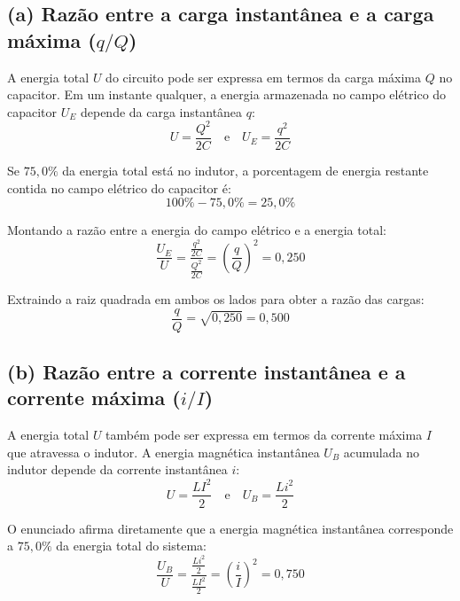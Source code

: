 \documentclass[12pt,a4paper]{article}
\begin{document}
\subsection*{(a) Razão entre a carga instantânea e a carga máxima ($q/Q$)}

A energia total $U$ do circuito pode ser expressa em termos da carga máxima $Q$ no capacitor. Em um instante qualquer, a energia armazenada no campo elétrico do capacitor $U_E$ depende da carga instantânea $q$:
\begin{equation*}
U = \frac{Q^2}{2C} \quad \text{e} \quad U_E = \frac{q^2}{2C}
\end{equation*}

Se $75,0\%$ da energia total está no indutor, a porcentagem de energia restante contida no campo elétrico do capacitor é:
\begin{equation*}
100\% - 75,0\% = 25,0\%
\end{equation*}

Montando a razão entre a energia do campo elétrico e a energia total:
\begin{equation*}
\frac{U_E}{U} = \frac{\frac{q^2}{2C}}{\frac{Q^2}{2C}} = \left(\frac{q}{Q}\right)^2 = 0,250
\end{equation*}

Extraindo a raiz quadrada em ambos os lados para obter a razão das cargas:
\begin{equation*}
\frac{q}{Q} = \sqrt{0,250} = 0,500
\end{equation*}

\subsection*{(b) Razão entre a corrente instantânea e a corrente máxima ($i/I$)}

A energia total $U$ também pode ser expressa em termos da corrente máxima $I$ que atravessa o indutor. A energia magnética instantânea $U_B$ acumulada no indutor depende da corrente instantânea $i$:
\begin{equation*}
U = \frac{L I^2}{2} \quad \text{e} \quad U_B = \frac{L i^2}{2}
\end{equation*}

O enunciado afirma diretamente que a energia magnética instantânea corresponde a $75,0\%$ da energia total do sistema:
\begin{equation*}
\frac{U_B}{U} = \frac{\frac{L i^2}{2}}{\frac{L I^2}{2}} = \left(\frac{i}{I}\right)^2 = 0,750
\end{equation*}
\end{document}
